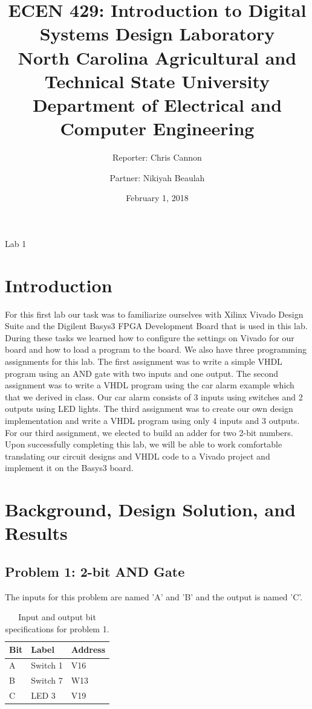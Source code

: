 \documentclass[11pt]{article}
\title {ECEN 429: Introduction to Digital Systems Design Laboratory \\ North Carolina Agricultural and Technical State University \\ Department of Electrical and Computer Engineering} %
\author{Reporter: Chris Cannon \\ \and Partner: Nikiyah Beaulah} %
\date{February 1, 2018}
\begin{document}
\maketitle %

\begin{center}
Lab	1
\end{center}

\pagebreak

\section{Introduction}
For this first lab our task was to familiarize ourselves with Xilinx Vivado Design Suite and the Digilent Basys3 FPGA Development Board that is used in this lab. During these tasks we learned how to configure the settings on Vivado for our board and how to load a program to the board. We also have three programming assignments for this lab. The first assignment was to write a simple VHDL program using an AND gate with two inputs and one output. The second assignment was to write a VHDL program using the car alarm example which that we derived in class. Our car alarm consists of 3 inputs using switches and 2 outputs using LED lights.  The third assignment was to create our own design implementation and write a VHDL program using only 4 inputs and 3 outputs. For our third assignment, we elected to build an adder for two 2-bit numbers. Upon successfully completing this lab, we will be able to work comfortable translating our circuit designs and VHDL code to a Vivado project and implement it on the Basys3 board.

\section{Background, Design Solution, and Results}
\subsection{Problem 1: 2-bit AND Gate}

The inputs for this problem are named 'A' and 'B' and the output is named 'C'.


\begin{table}[h]
\begin{center}
	\begin{tabular}{| l | l | l |}
		\hline
		Bit & Label & Address\\ \hline
		A & Switch 1 & V16\\ \hline
		B & Switch 7 & W13\\ \hline
		C & LED 3 & V19\\ \hline
	\end{tabular}
	\caption{\label{tab:table-name}Input and output bit specifications for problem 1.}
\end{center}
\end{table}
\end{document}

